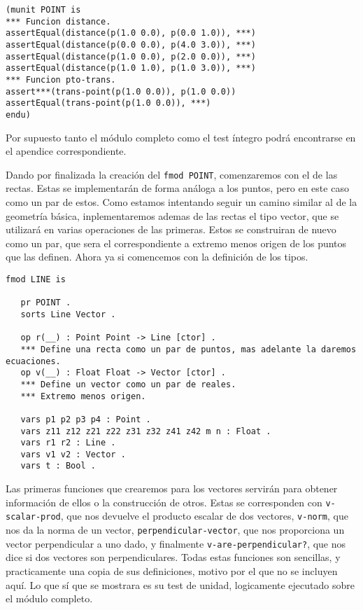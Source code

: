 {\codesize
\begin{verbatim}
(munit POINT is
*** Funcion distance.
assertEqual(distance(p(1.0 0.0), p(0.0 1.0)), ***)
assertEqual(distance(p(0.0 0.0), p(4.0 3.0)), ***)
assertEqual(distance(p(1.0 0.0), p(2.0 0.0)), ***)
assertEqual(distance(p(1.0 1.0), p(1.0 3.0)), ***)
*** Funcion pto-trans.
assert***(trans-point(p(1.0 0.0)), p(1.0 0.0))
assertEqual(trans-point(p(1.0 0.0)), ***)
endu)
\end{verbatim}
}

Por supuesto tanto el módulo completo como el test íntegro podrá encontrarse en el apendice correspondiente.\par

Dando por finalizada la creación del \texttt{fmod POINT}, comenzaremos con el de las rectas. Estas se implementarán de forma análoga a los puntos, pero en este caso como un par de estos. Como estamos intentando seguir un camino similar al de la geometría básica, inplementaremos ademas de las rectas el tipo vector, que se utilizará en varias operaciones de las primeras. Estos se construiran de nuevo como un par, que sera el correspondiente a extremo menos origen de los puntos que las definen. Ahora ya si comencemos con la definición de los tipos.\par 

{\codesize
\begin{verbatim}
fmod LINE is 

   pr POINT .
   sorts Line Vector .

   op r(__) : Point Point -> Line [ctor] .
   *** Define una recta como un par de puntos, mas adelante la daremos ecuaciones.
   op v(__) : Float Float -> Vector [ctor] .
   *** Define un vector como un par de reales.
   *** Extremo menos origen.

   vars p1 p2 p3 p4 : Point .
   vars z11 z12 z21 z22 z31 z32 z41 z42 m n : Float .
   vars r1 r2 : Line .
   vars v1 v2 : Vector .
   vars t : Bool .
\end{verbatim}
}

Las primeras funciones que crearemos para los vectores servirán para obtener información de ellos o la construcción de otros. Estas se corresponden con \texttt{v-scalar-prod}, que nos devuelve el producto escalar de dos vectores, \texttt{v-norm}, que nos da la norma de un vector, \texttt{perpendicular-vector}, que nos proporciona un vector perpendicular a uno dado, y finalmente \texttt{v-are-perpendicular?}, que nos dice si dos vectores son perpendiculares. Todas estas funciones son sencillas, y practicamente una copia de sus definiciones, motivo por el que no se incluyen aquí. Lo que sí que se mostrara es su test de unidad, logicamente ejecutado sobre el módulo completo.\par

